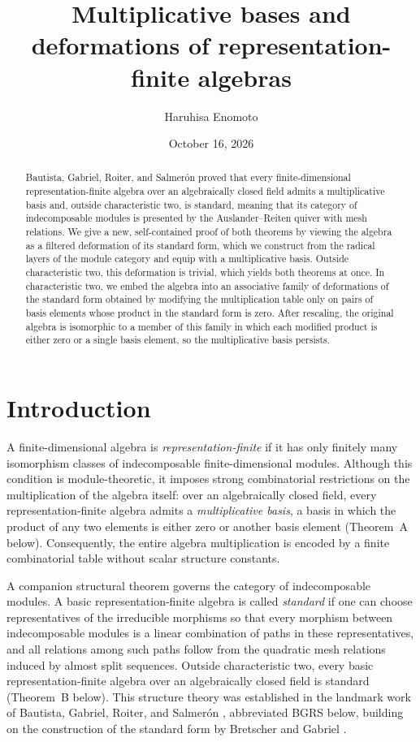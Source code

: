 \documentclass[a4paper,reqno,11pt]{amsart}
\title{Multiplicative bases and deformations of representation-finite algebras}
\author[H.\ Enomoto]{Haruhisa Enomoto}
\date{October 16, 2026}
\theoremstyle{definition}
\begin{document}
\begin{abstract}
Bautista, Gabriel, Roiter, and Salmer\'on proved that every
finite-dimensional representation-finite algebra over an algebraically
closed field admits a multiplicative basis and, outside characteristic two, is
standard, meaning that its category of indecomposable modules is presented by
the Auslander--Reiten quiver with mesh relations. We give a new,
self-contained proof of both theorems by viewing the algebra as a filtered
deformation of its standard form, which we construct from the radical layers
of the module category and equip with a multiplicative basis. Outside
characteristic two, this deformation is trivial, which yields both theorems
at once. In characteristic two, we embed the algebra into an associative
family of deformations of the standard form obtained by modifying the
multiplication table only on pairs of basis elements whose product in the
standard form is zero. After rescaling, the original algebra is isomorphic to
a member of this family in which each modified product is either zero or a
single basis element, so the multiplicative basis persists.
\end{abstract}

\maketitle
\tableofcontents
\clearpage

\section{Introduction}
\label{sec:introduction}

A finite-dimensional algebra is \emph{representation-finite} if it has only
finitely many isomorphism classes of indecomposable finite-dimensional
modules. Although this condition is module-theoretic, it imposes strong
combinatorial restrictions on the multiplication of the algebra itself: over
an algebraically closed field, every representation-finite algebra admits a
\emph{multiplicative basis}, a basis in which the product of any two elements
is either zero or another basis element (Theorem~A below). Consequently, the
entire algebra multiplication is encoded by a finite combinatorial table
without scalar structure constants.

A companion structural theorem governs the category of indecomposable
modules. A basic representation-finite algebra is called \emph{standard} if
one can choose representatives of the irreducible morphisms so that every
morphism between indecomposable modules is a linear combination of paths in
these representatives, and all relations among such paths follow from the
quadratic mesh relations induced by almost split sequences. Outside
characteristic two, every basic representation-finite algebra over an
algebraically closed field is standard (Theorem~B below). This structure
theory was established in the landmark work of Bautista, Gabriel, Roiter,
and Salmer\'on \cite{BGRS}, abbreviated BGRS below, building on the
construction of the standard form by Bretscher and Gabriel
\cite{BretscherGabriel}.
\end{document}
